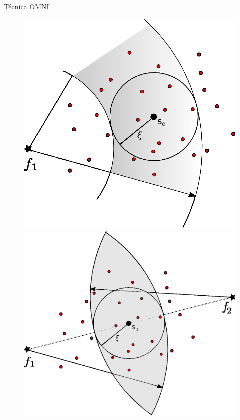 \documentclass{beamer}
\begin{document}
\begin{frame}{Técnica OMNI}

	\begin{figure}
	    \centering
	    \begin{minipage}{.5\textwidth}
	      \centering
	      \includegraphics[width=.9\linewidth]{rg_omni_1.eps}


	    \end{minipage}%
	    \begin{minipage}{.5\textwidth}
	      \centering
	      \includegraphics[width=.95\linewidth]{rg_omni_2.eps}


	    \end{minipage}
	\end{figure}
 
\end{frame}
\end{document}
